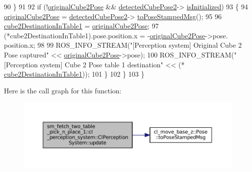 \begin{DoxyCode}
90             \}
91 
92             \textcolor{keywordflow}{if} (!\hyperlink{classsm__fetch__two__table__pick__n__place__1_1_1cl__perception__system_1_1ClPerceptionSystem_a25eb595d1c9f8256f4bd5ae1ac3d5651}{originalCube2Pose} && \hyperlink{classsm__fetch__two__table__pick__n__place__1_1_1cl__perception__system_1_1ClPerceptionSystem_ab4594ab1597649673845c90002c8a8e7}{detectedCubePose2}->
      \hyperlink{classcl__move__base__z_1_1Pose_a49df3a978021edb71a48ef5e6d8e75a8}{isInitialized})
93             \{
94                 \hyperlink{classsm__fetch__two__table__pick__n__place__1_1_1cl__perception__system_1_1ClPerceptionSystem_a25eb595d1c9f8256f4bd5ae1ac3d5651}{originalCube2Pose} = \hyperlink{classsm__fetch__two__table__pick__n__place__1_1_1cl__perception__system_1_1ClPerceptionSystem_ab4594ab1597649673845c90002c8a8e7}{detectedCubePose2}->
      \hyperlink{classcl__move__base__z_1_1Pose_a63887a88c1ac6e9a4a71b8d7d11aed6c}{toPoseStampedMsg}();
95 
96                 \hyperlink{classsm__fetch__two__table__pick__n__place__1_1_1cl__perception__system_1_1ClPerceptionSystem_aacd55af08e30d8b6b1303a670acd3328}{cube2DestinationInTable1} = 
      \hyperlink{classsm__fetch__two__table__pick__n__place__1_1_1cl__perception__system_1_1ClPerceptionSystem_a25eb595d1c9f8256f4bd5ae1ac3d5651}{originalCube2Pose};
97                 (*cube2DestinationInTable1).pose.position.x = -\hyperlink{classsm__fetch__two__table__pick__n__place__1_1_1cl__perception__system_1_1ClPerceptionSystem_a25eb595d1c9f8256f4bd5ae1ac3d5651}{originalCube2Pose}->pose.
      position.x;
98 
99                 ROS\_INFO\_STREAM(\textcolor{stringliteral}{"[Perception system] Original Cube 2 Pose captured"} << 
      \hyperlink{classsm__fetch__two__table__pick__n__place__1_1_1cl__perception__system_1_1ClPerceptionSystem_a25eb595d1c9f8256f4bd5ae1ac3d5651}{originalCube2Pose}->pose);
100                 ROS\_INFO\_STREAM(\textcolor{stringliteral}{"[Perception system] Cube 2 Pose table 1 destination"} << (*
      \hyperlink{classsm__fetch__two__table__pick__n__place__1_1_1cl__perception__system_1_1ClPerceptionSystem_aacd55af08e30d8b6b1303a670acd3328}{cube2DestinationInTable1}));
101             \}
102         \}
103     \}
\end{DoxyCode}
Here is the call graph for this function\+:
\nopagebreak
\begin{figure}[H]
\begin{center}
\leavevmode
\includegraphics[width=350pt]{classsm__fetch__two__table__pick__n__place__1_1_1cl__perception__system_1_1ClPerceptionSystem_ac6e10d6fc38d2b1d561875298307c235_cgraph}
\end{center}
\end{figure}


